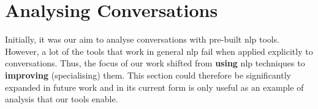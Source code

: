 \chapter{Analysing Conversations}
Initially, it was our aim to analyse conversations with pre-built \gls{nlp} tools. However, a lot of the tools that work in general \gls{nlp} fail when applied explicitly to conversations. Thus, the focus of our work shifted from \textbf{using} \gls{nlp} techniques to \textbf{improving} (specialising) them. This section could therefore be significantly expanded in future work and in its current form is only useful as an example of analysis that our tools enable.



\glsresetall
